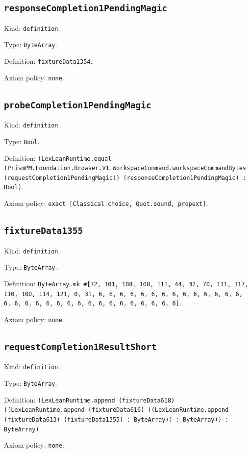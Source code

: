 \documentclass[11pt]{article}
\begin{document}
\subsection*{\texttt{responseCompletion1PendingMagic}}
\noindent Kind: \texttt{definition}.\par
\noindent Type: \texttt{ByteArray}.\par
\noindent Definition: \texttt{fixtureData1354}.\par
\noindent Axiom policy: \texttt{none}.\par
\subsection*{\texttt{probeCompletion1PendingMagic}}
\noindent Kind: \texttt{definition}.\par
\noindent Type: \texttt{Bool}.\par
\noindent Definition: \texttt{(LexLeanRuntime.equal (PrismPM.Foundation.Browser.V1.WorkspaceCommand.workspaceCommandBytes (requestCompletion1PendingMagic)) (responseCompletion1PendingMagic) : Bool)}.\par
\noindent Axiom policy: \texttt{exact [Classical.choice, Quot.sound, propext]}.\par
\subsection*{\texttt{fixtureData1355}}
\noindent Kind: \texttt{definition}.\par
\noindent Type: \texttt{ByteArray}.\par
\noindent Definition: \texttt{ByteArray.mk \#[72, 101, 108, 108, 111, 44, 32, 70, 111, 117, 110, 100, 114, 121, 0, 31, 6, 6, 6, 6, 6, 6, 6, 6, 6, 6, 6, 6, 6, 6, 6, 6, 6, 6, 6, 6, 6, 6, 6, 6, 6, 6, 6, 6, 6, 6, 6]}.\par
\noindent Axiom policy: \texttt{none}.\par
\subsection*{\texttt{requestCompletion1ResultShort}}
\noindent Kind: \texttt{definition}.\par
\noindent Type: \texttt{ByteArray}.\par
\noindent Definition: \texttt{(LexLeanRuntime.append (fixtureData618) ((LexLeanRuntime.append (fixtureData616) ((LexLeanRuntime.append (fixtureData613) (fixtureData1355) : ByteArray)) : ByteArray)) : ByteArray)}.\par
\noindent Axiom policy: \texttt{none}.\par
\end{document}
